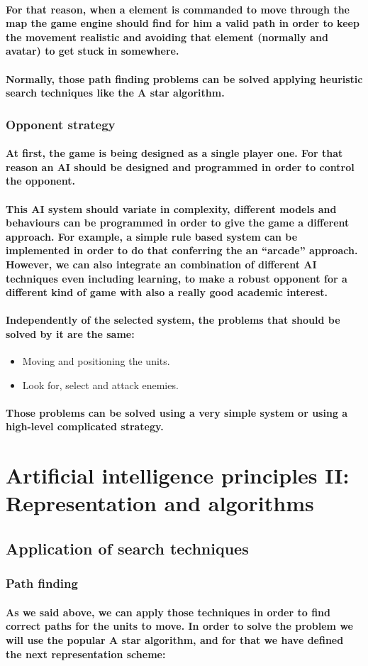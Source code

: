 \documentclass[a4paper,10pt]{article}
\newcommand{\p}[1]{\paragraph{\indent\textnormal{#1}}}
\begin{document}
    \p{For that reason, when a element is commanded to move through the map the game engine should find for him a valid path in order to keep the movement realistic and avoiding that element (normally and avatar) to get stuck in somewhere.}

    \p{Normally, those path finding problems can be solved applying heuristic search techniques like the A star algorithm.}

   \subsubsection{Opponent strategy}

    \p{At first, the game is being designed as a single player one. For that reason an AI should be designed and programmed in order to control the opponent.}

    \p{This AI system should variate in complexity, different models and behaviours can be programmed in order to give the game a different approach. For example, a simple rule based system can be implemented in order to do that conferring the an ``arcade'' approach. However, we can also integrate an combination of different AI techniques even including learning, to make a robust opponent for a different kind of game with also a really good academic interest.}

    \p{Independently of the selected system, the problems that should be solved by it are the same:}

    \begin{itemize}
     \item Moving and positioning the units.
     \item Look for, select and attack enemies.
    \end{itemize}
  
    \p{Those problems can be solved using a very simple system or using a high-level complicated strategy.}


  \newpage
\section{Artificial intelligence principles II: Representation and algorithms}

  \subsection{Application of search techniques}

    \subsubsection{Path finding}
    \p{As we said above, we can apply those techniques in order to find correct paths for the units to move. In order to solve the problem we will use the popular A star algorithm, and for that we have defined the next representation scheme:}
\end{document}
